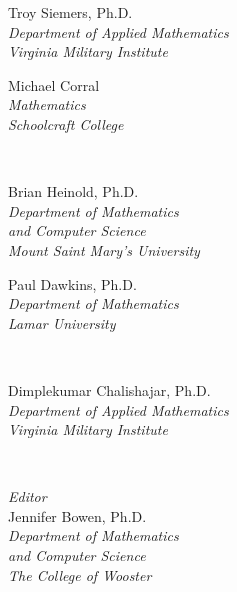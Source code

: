 
\begingroup


%
\parbox[t]{\cellwidth}{Troy Siemers, Ph.D.\\\small
\emph{Department of Applied Mathematics}\\
\emph{Virginia Military Institute}}
\parbox[t]{\cellwidth}{Michael Corral\\\small
\emph{Mathematics}\\
\emph{Schoolcraft College}}
\\[\baselineskip]
\parbox[t]{\cellwidth}{Brian Heinold, Ph.D.\\\small
\emph{Department of Mathematics}\\
\emph{and Computer Science}\\
\emph{Mount Saint Mary's University}}
\parbox[t]{\cellwidth}{Paul Dawkins, Ph.D.\\\small
\emph{Department of Mathematics}\\
\emph{Lamar University}}
\\[\baselineskip]
\parbox[t]{\cellwidth}{Dimplekumar Chalishajar, Ph.D.\\\small
\emph{Department of Applied Mathematics}\\
\emph{Virginia Military Institute}}
\\[2\baselineskip]
\parbox[t]{\cellwidth}{\emph{Editor}\\
Jennifer Bowen, Ph.D.\\\small
\emph{Department of Mathematics}\\
\emph{and Computer Science}\\
\emph{The College of Wooster}}

\vspace{1in}

